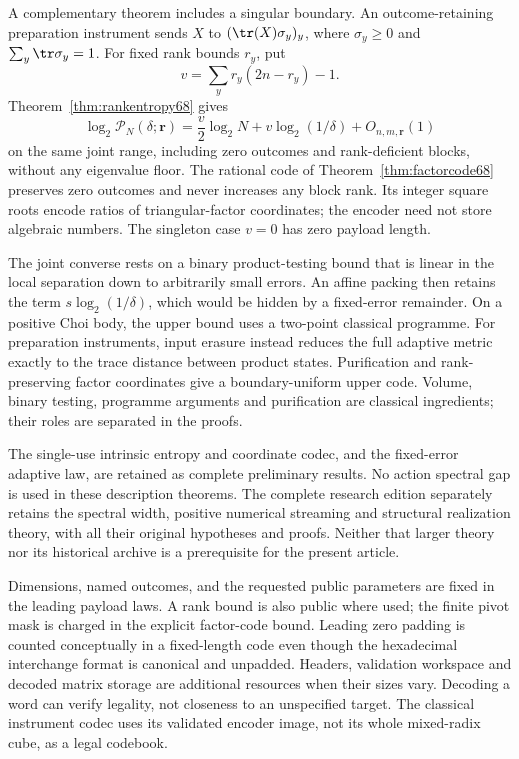 A complementary theorem includes a singular boundary. An
outcome-retaining preparation instrument sends $X$ to
$(\tr(X)\sigma_y)_y$, where $\sigma_y\ge0$ and
$\sum_y\tr\sigma_y=1$. For fixed rank bounds $r_y$, put
\[
                  v=\sum_y r_y(2n-r_y)-1.
\]
Theorem~\ref{thm:rankentropy68} gives
\[
 \log_2\mathcal P_N(\delta;\mathbf r)
 =\frac v2\log_2N+v\log_2(1/\delta)+O_{n,m,\mathbf r}(1)
\]
on the same joint range, including zero outcomes and rank-deficient
blocks, without any eigenvalue floor. The rational code of
Theorem~\ref{thm:factorcode68} preserves zero outcomes and never
increases any block rank. Its integer square roots encode ratios of
triangular-factor coordinates; the encoder need not store algebraic
numbers. The singleton case $v=0$ has zero payload length.

The joint converse rests on a binary product-testing bound that is
linear in the local separation down to arbitrarily small errors.
An affine packing then retains the term $s\log_2(1/\delta)$, which
would be hidden by a fixed-error remainder. On a positive Choi body,
the upper bound uses a two-point classical programme. For preparation
instruments, input erasure instead reduces the full adaptive metric
exactly to the trace distance between product states. Purification
and rank-preserving factor coordinates give a boundary-uniform upper
code. Volume, binary testing, programme arguments and purification
are classical ingredients; their roles are separated in the proofs.

The single-use intrinsic entropy and coordinate codec, and the
fixed-error adaptive law, are retained as complete preliminary
results. No action spectral gap is used in these description theorems.
The complete research edition separately retains the spectral width,
positive numerical streaming and structural realization theory, with
all their original hypotheses and proofs. Neither that larger theory
nor its historical archive is a prerequisite for the present article.

Dimensions, named outcomes, and the requested public parameters are
fixed in the leading payload laws. A rank bound is also public where
used; the finite pivot mask is charged in the explicit factor-code
bound. Leading zero padding is counted conceptually in a fixed-length
code even though the hexadecimal interchange format is canonical and
unpadded. Headers, validation workspace and decoded matrix storage
are additional resources when their sizes vary. Decoding a word can
verify legality, not closeness to an unspecified target. The classical
instrument codec uses its validated encoder image, not its whole
mixed-radix cube, as a legal codebook.
